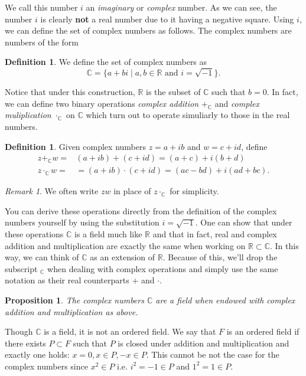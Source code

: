 \documentclass[12pt]{article}
\newcommand{\bbR}{\mathbb{R}}
\newcommand{\bbC}{\mathbb{C}}
\newtheorem{prop}[thm]{Proposition}
\theoremstyle{definition}
\newtheorem{defn}[thm]{Definition}
\theoremstyle{remark}
\newtheorem{rem}[thm]{Remark}
\numberwithin{equation}{section}
\begin{document}
We call this number $i$ an \emph{imaginary} or \emph{complex} number. As we can see, the number $i$ is clearly \textbf{not} a real number due to it having a negative square. Using $i$, we can define the set of complex numbers as follows. The complex numbers are numbers of the form 

\begin{defn}
  We define the set of complex numbers as 
\begin{equation}
  \bbC = \{ a + bi \mid a, b \in \bbR \text{ and } i = \sqrt{-1} \}.
\end{equation}
\end{defn}

Notice that under this construction, $\bbR$ is the subset of $\bbC$ such that $b=0$. In fact, we can define two binary operations \emph{complex addition} $+_\bbC$ and \emph{complex muliplication} $\cdot_\bbC$ on $\bbC$ which turn out to operate simuliarly to those in the real numbers.

\begin{defn}
  Given complex numbers $z=a+ib$ and $w=c+id$, define
\begin{align}
  z +_\bbC w=& (a+ib)+(c+id)=(a+c)+i(b+d)\\
  z\cdot_\bbC w=&= (a+ib)\cdot(c+id)=(ac-bd)+ i(ad+bc).
\end{align}
\end{defn}

\begin{rem}
  We often write $zw$ in place of $z\cdot_\bbC$ for simplicity.
\end{rem}

You can derive these operations directly from the definition of the complex numbers yourself by using the substitution $i = \sqrt{-1}$. One can show that under these operations $\bbC$ is a field much like $\bbR$ and that in fact, real and complex addition and multiplication are exactly the same when working on $\bbR \subset \bbC$. In this way, we can think of $\bbC$ as an extension of $\bbR$. Because of this, we'll drop the subscript $_\bbC$ when dealing with complex operations and simply use the same notation as their real counterparts $+$ and $\cdot$.

\begin{prop}
  The complex numbers $\bbC$ are a field when endowed with complex addition and multiplication as above.
\end{prop}

Though $\bbC$ is a field, it is not an ordered field. We say that $F$ is an ordered field if there exists $P\subset F$ such that $P$ is closed under addition and multiplication and exactly one holds: $x=0, x\in P, -x\in P$. This cannot be not the case for the complex numbers since $x^2\in P$ i.e. $i^2=-1\in P$ and $1^2=1\in P$.
\end{document}
